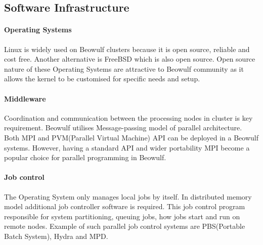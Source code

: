 \subsection{Software Infrastructure}
\paragraph{Operating Systems}
Linux is widely used on Beowulf clusters because it is open source, reliable and cost free. Another alternative is FreeBSD which is also open source. Open source nature of these Operating Systems are attractive to Beowulf community as it allows the kernel to be customised for specific needs and setup. \citep{Gropp:beowulf}

\paragraph{Middleware}
Coordination and communication between the processing nodes in cluster is key requirement. Beowulf utilises Message-passing model of parallel architecture. Both MPI and PVM(Parallel Virtual Machine) API can be deployed in a Beowulf systems. However, having a standard API and wider portability MPI become a popular choice for parallel programming in Beowulf. \citep{Gropp:beowulf}

\paragraph{Job control}
The Operating System only manages local jobs by itself. In distributed memory model additional job controller software is required. This job control program responsible for system partitioning, queuing jobs, how jobs start and run on remote nodes\citep{Gropp:beowulf}. Example of such parallel job control systems are PBS(Portable Batch System), Hydra and MPD. 